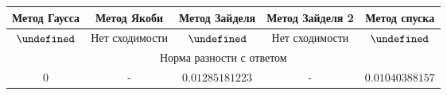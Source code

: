 \documentclass[../../report.tex]{subfiles}
\let\hilbertGauss\hilbertResult
\let\hilbertResult\undefined
\let\hilbertResult\undefined
\let\hilbertSeidel\hilbertResult
\let\hilbertResult\undefined
\let\hilbertResult\undefined
\let\hilbertGrad\hilbertResult
\let\hilbertResult\undefined
\begin{document}
\begin{tabular}{|c|c|c|c|c|}
\hline
Метод Гаусса & Метод Якоби & Метод Зайделя & Метод Зайделя 2 & Метод спуска\\
\hline
$ \hilbertGauss $  
  &
Нет сходимости 
  &
$ \hilbertSeidel $
  &
Нет сходимости
  &
$ \hilbertGrad $ \\
\hline
\multicolumn{5}{|c|}{Норма разности с ответом}\\
\hline
$0$ & - & $0.01285181223$ & - & $0.01040388157$ \\
\hline
\end{tabular} \\
\end{document}

